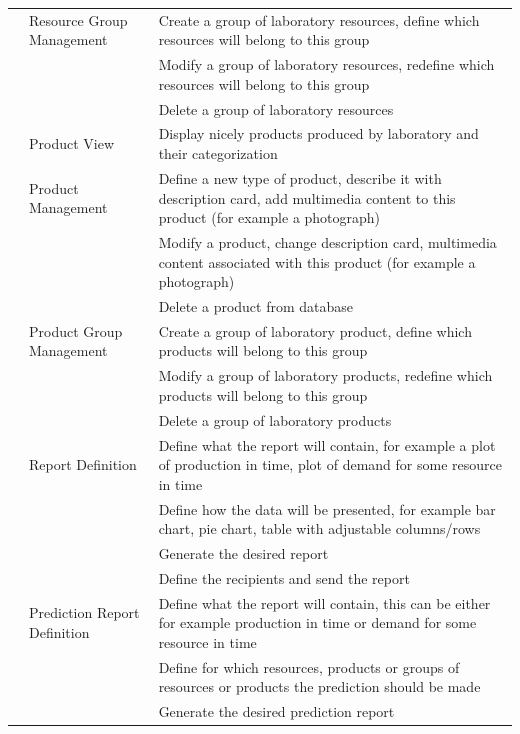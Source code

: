 \documentclass[a4paper,11pt,twoside]{report}
\theoremstyle{definition}
\begin{document}
\begin{longtable}{|p{3cm}|p{3cm}|p{10cm}|}
\texttt{} & Resource Group \mbox{Management} & Create a group of laboratory resources, define which resources will belong to this group\\ \cline{3-3}
\texttt{} & & Modify a group of laboratory resources, redefine which resources will belong to this group\\ \cline{3-3}
\texttt{} & & Delete a group of laboratory resources\\ \cline{2-3}
\texttt{} & Product View & Display nicely products produced by laboratory and their categorization\\ \cline{2-3}
\texttt{} & Product \mbox{Management} & Define a new type of product, describe it with description card, add multimedia content to this product (for example a photograph)\\ \cline{3-3}
\texttt{} & & Modify a product, change description card, multimedia content associated with this product (for example a photograph)\\ \cline{3-3}
\texttt{} & & Delete a product from database\\ \cline{2-3}
\texttt{} & Product Group \mbox{Management} & Create a group of laboratory product, define which products will belong to this group\\ \cline{3-3}
\texttt{} & & Modify a group of laboratory products, redefine which products will belong to this group\\ \cline{3-3}
\texttt{} & & Delete a group of laboratory products\\ \cline{2-3}

\texttt{} & Report \mbox{Definition} & Define what the report will contain, for example a plot of production in time, plot of demand for some resource in time\\ \cline{3-3}
\texttt{} & & Define how the data will be presented, for example bar chart, pie chart, table with adjustable columns/rows \\ \cline{3-3}
\texttt{} & & Generate the desired report \\ \cline{3-3}
\texttt{} & & Define the recipients and send the report \\ \cline{2-3}
\texttt{} & Prediction Report \mbox{Definition} & Define what the report will contain, this can be either for example production in time or demand for some resource in time\\ \cline{3-3}
\texttt{} & & Define for which resources, products or groups of resources or products the prediction should be made\\ \cline{3-3}
\texttt{} & & Generate the desired prediction report \\ \cline{3-3}




\end{longtable}
\end{document}
